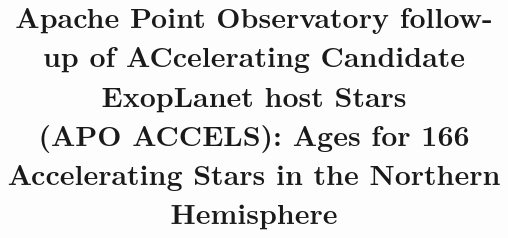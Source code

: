 \documentclass{aastex631}
\begin{document}
\title{Apache Point Observatory follow-up of ACcelerating Candidate ExopLanet host Stars \\(APO ACCELS): Ages for 166 Accelerating Stars in the Northern Hemisphere}


\end{document}
